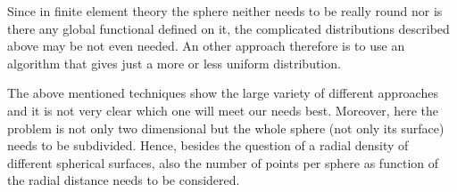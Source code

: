 Since in finite element theory the sphere neither needs to be really round nor is there any global functional defined on it,
the complicated distributions described above may be not even needed. 
An other approach therefore is to use an algorithm that gives just a more or less uniform distribution.


The above mentioned techniques show the large variety of different approaches and it is not very clear which one will meet our needs best.
Moreover, here the problem is not only two dimensional but the whole sphere (not only its surface) needs to be subdivided. 
Hence, besides the question of a radial density of different spherical surfaces, also the number of points per sphere as function of the radial distance 
needs to be considered.



